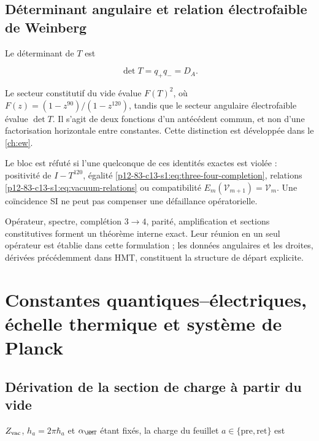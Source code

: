 \subsection{Déterminant angulaire et relation électrofaible de Weinberg}

Le déterminant de \(T\) est

\begin{equation}
\det T=q_+q_-=D_A.
\label{p12-83-c13-s1:eq:detT}
\end{equation}

Le secteur constitutif du vide évalue \(F(T)^2\), où
\(F(z)=(1-z^{90})/(1-z^{120})\), tandis que le secteur angulaire
électrofaible évalue \(\det T\). Il s'agit de deux fonctions d'un
antécédent commun, et non d'une factorisation horizontale entre constantes.
Cette distinction est développée dans le \cref{ch:ew}.

\begin{falsifier}
Le bloc est réfuté si l'une quelconque de ces identités exactes est violée :
positivité de \(I-T^{120}\), égalité
\cref{p12-83-c13-s1:eq:three-four-completion}, relations \cref{p12-83-c13-s1:eq:vacuum-relations} ou
compatibilité \(E_m(\mathcal V_{m+1})=\mathcal V_m\). Une coïncidence SI
ne peut pas compenser une défaillance opératorielle.
\end{falsifier}

\begin{statusbox}
Opérateur, spectre, complétion \(3\to4\), parité, amplification et
sections constitutives forment un théorème interne exact. Leur réunion en un
seul opérateur est établie dans cette formulation ; les données angulaires et
les droites, dérivées précédemment dans HMT, constituent la structure de départ
explicite.
\end{statusbox}


\section{Constantes quantiques--électriques, échelle thermique et système de Planck}
\label{p12-83-c13-s2:ch:metrology}

\subsection{Dérivation de la section de charge à partir du vide}

\(Z_{\rm vac}\), \(h_a=2\pi\hbar_a\) et \(\alpha_{\HMT}\) étant fixés, la charge du feuillet \(a\in\{\mathrm{pre},\mathrm{ret}\}\) est

